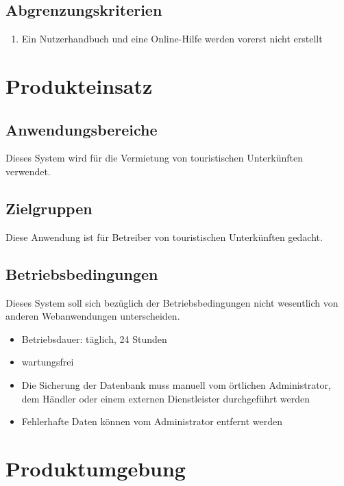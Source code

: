\documentclass[a4paper,oneside]{scrreprt}
\begin{document}
\section{Abgrenzungskriterien}
\begin{enumerate}
\item Ein Nutzerhandbuch und eine Online-Hilfe werden vorerst nicht erstellt
\end{enumerate}





\chapter{Produkteinsatz}
\section{Anwendungsbereiche}

Dieses System wird für die Vermietung von touristischen Unterkünften verwendet.


\section{Zielgruppen}

Diese Anwendung ist für Betreiber von touristischen Unterkünften gedacht.

\section{Betriebsbedingungen}
Dieses System soll sich bezüglich der Betriebsbedingungen nicht wesentlich von anderen Webanwendungen unterscheiden.

\begin{itemize}
\item Betriebsdauer: täglich, 24 Stunden
\item wartungsfrei
\item Die Sicherung der Datenbank muss manuell vom örtlichen Administrator, dem Händler oder einem externen Dienstleister durchgeführt werden
\item Fehlerhafte Daten können vom Administrator entfernt werden
\end{itemize}






\chapter{Produktumgebung}
\end{document}
